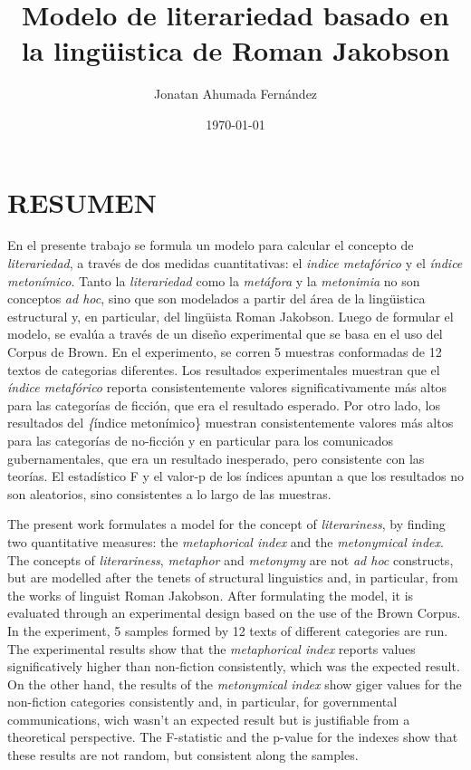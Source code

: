 \documentclass[12pt,letterpaper,twoside]{article}
\author{Jonatan Ahumada Fernández}
\date{\today}
\title{Modelo de literariedad basado en la lingüistica de Roman Jakobson}
\begin{document}
\maketitle
\tableofcontents

\doublespacing
\raggedright
\setlength{\parindent}{1.25cm}
\@afterindentfalse 





\section{RESUMEN}
\label{sec:org308d166}

En el presente trabajo se formula un modelo para calcular el concepto
de \emph{literariedad}, a través de dos medidas cuantitativas: el
\emph{indice metafórico} y el \emph{índice metonímico}.  Tanto la
\emph{literariedad} como la \emph{metáfora} y la \emph{metonimia} no
son conceptos \emph{ad hoc}, sino que son modelados a partir del área
de la lingüistica estructural y, en particular, del lingüista Roman
Jakobson. Luego de formular el modelo, se evalúa a través de un diseño
experimental que se basa en el uso del Corpus de Brown. En el
experimento, se corren 5 muestras conformadas de 12 textos de
categorias diferentes. Los resultados experimentales muestran que el
\emph{índice metafórico} reporta consistentemente valores
significativamente más altos para las categorías de ficción, que era
el resultado esperado. Por otro lado, los resultados del \emph\{índice
metonímico\} muestran consistentemente valores más altos para las
categorías de no-ficción y en particular para los comunicados
gubernamentales, que era un resultado inesperado, pero consistente con
las teorías. El estadístico F y el valor-p de los índices apuntan a
que los resultados no son aleatorios, sino consistentes a lo largo de
las muestras.



The present work formulates a model for the concept of
\emph{literariness}, by finding two quantitative measures: the
\emph{metaphorical index} and the \emph{metonymical index}.  The
concepts of \emph{literariness}, \emph{metaphor} and \emph{metonymy}
are not \emph{ad hoc} constructs, but are modelled after the tenets
of structural linguistics and, in particular, from the works of
linguist Roman Jakobson. After formulating the model, it is evaluated
through an experimental design based on the use of the Brown
Corpus. In the experiment, 5 samples formed by 12 texts of different
categories are run.  The experimental results show that the
\emph{metaphorical index} reports values significatively higher than
non-fiction consistently, which was the expected result. On the other
hand, the results of the \emph{metonymical index} show giger values
for the non-fiction categories consistently and, in particular, for
governmental communications, wich wasn't an expected result but is
justifiable from a theoretical perspective.  The F-statistic and the
p-value for the indexes show that these results are not random, but
consistent along the samples.  
\end{document}
